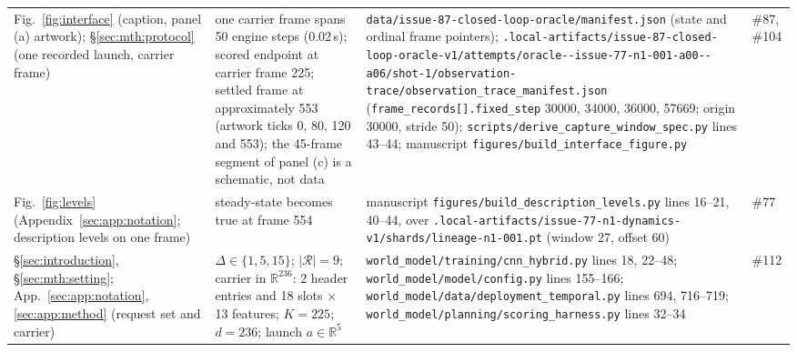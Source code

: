 {\begin{revblock}
\begin{longtable}{@{}>{\raggedright\arraybackslash}p{}>{\raggedright\arraybackslash}p{}>{\raggedright\arraybackslash}p{}>{\raggedright\arraybackslash}p{}@{}}
Fig.~\ref{fig:interface} (caption, panel (a) artwork); \S\ref{sec:mth:protocol} (one recorded launch, carrier frame) & one carrier frame spans 50 engine steps (0.02\,s); scored endpoint at carrier frame 225; settled frame at approximately 553 (artwork ticks 0, 80, 120 and 553); the 45-frame segment of panel (c) is a schematic, not data & \nolinkurl{data/issue-87-closed-loop-oracle/manifest.json} (state and ordinal frame pointers); \nolinkurl{.local-artifacts/issue-87-closed-loop-oracle-v1/attempts/oracle--issue-77-n1-001-a00--a06/shot-1/observation-trace/observation_trace_manifest.json} (\nolinkurl{frame_records[].fixed_step} 30000, 34000, 36000, 57669; origin 30000, stride 50); \nolinkurl{scripts/derive_capture_window_spec.py} lines 43--44; manuscript \nolinkurl{figures/build_interface_figure.py} & \#87, \#104 \\
Fig.~\ref{fig:levels} (Appendix~\ref{sec:app:notation}; description levels on one frame) & steady-state becomes true at frame 554 & manuscript \nolinkurl{figures/build_description_levels.py} lines 16--21, 40--44, over \nolinkurl{.local-artifacts/issue-77-n1-dynamics-v1/shards/lineage-n1-001.pt} (window 27, offset 60) & \#77 \\
\S\ref{sec:introduction}, \S\ref{sec:mth:setting}; App.~\ref{sec:app:notation}, \ref{sec:app:method} (request set and carrier) & $\Delta\in\{1,5,15\}$; $|\mathcal{R}|=9$; carrier in $\mathbb{R}^{236}$: 2 header entries and 18 slots $\times$ 13 features; $K=225$; $d=236$; launch $a\in\mathbb{R}^5$ & \nolinkurl{world_model/training/cnn_hybrid.py} lines 18, 22--48; \nolinkurl{world_model/model/config.py} lines 155--166; \nolinkurl{world_model/data/deployment_temporal.py} lines 694, 716--719; \nolinkurl{world_model/planning/scoring_harness.py} lines 32--34 & \#112 \\

\end{longtable}
\end{revblock}}
